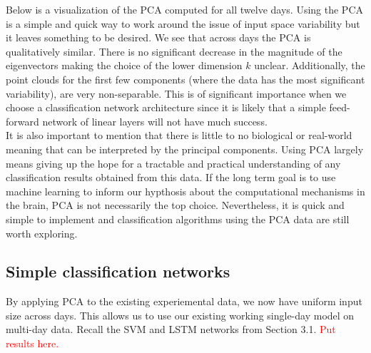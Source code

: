 \documentclass[12pt]{article}
\begin{document}
Below is a visualization of the PCA computed for all twelve days. Using the PCA is a simple and quick way to work around the issue of input space variability but it leaves something to be desired. We see that across days the PCA is qualitatively similar. There is no significant decrease in the magnitude of the eigenvectors making the choice of the lower dimension $k$ unclear. Additionally, the point clouds for the first few components (where the data has the most significant variability), are very non-separable. This is of significant importance when we choose a classification network architecture since it is likely that a simple feed-forward network of linear layers will not have much success. \\
It is also important to mention that there is little to no biological or real-world meaning that can be interpreted by the principal components. Using PCA largely means giving up the hope for a tractable and practical understanding of any classification results obtained from this data. If the long term goal is to use machine learning to inform our hypthosis about the computational mechanisms in the brain, PCA is not necessarily the top choice. Nevertheless, it is quick and simple to implement and classification algorithms using the PCA data are still worth exploring.
\subsection{Simple classification networks}
By applying PCA to the existing experiemental data, we now have uniform input size across days. This allows us to use our existing working single-day model on multi-day data. Recall the SVM and LSTM networks from Section 3.1. \textcolor{red}{Put results here.}
\end{document}
